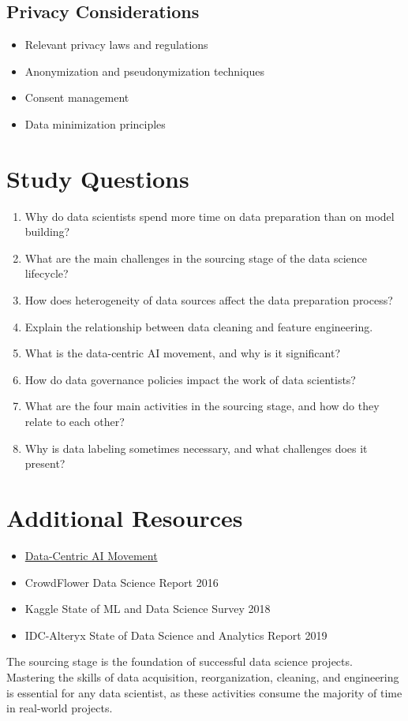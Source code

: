 \documentclass[12pt]{article}
\begin{document}
\subsection{Privacy Considerations}
\begin{itemize}
    \item Relevant privacy laws and regulations
    \item Anonymization and pseudonymization techniques
    \item Consent management
    \item Data minimization principles
\end{itemize}

\section{Study Questions}

\begin{enumerate}
    \item Why do data scientists spend more time on data preparation than on model building?
    \item What are the main challenges in the sourcing stage of the data science lifecycle?
    \item How does heterogeneity of data sources affect the data preparation process?
    \item Explain the relationship between data cleaning and feature engineering.
    \item What is the data-centric AI movement, and why is it significant?
    \item How do data governance policies impact the work of data scientists?
    \item What are the four main activities in the sourcing stage, and how do they relate to each other?
    \item Why is data labeling sometimes necessary, and what challenges does it present?
\end{enumerate}

\section{Additional Resources}

\begin{itemize}
    \item \href{https://datacentricai.org/}{Data-Centric AI Movement}
    \item CrowdFlower Data Science Report 2016
    \item Kaggle State of ML and Data Science Survey 2018
    \item IDC-Alteryx State of Data Science and Analytics Report 2019
\end{itemize}

\begin{tcolorbox}[colback=red!5!white,colframe=red!75!black,title=Key Takeaway]
The sourcing stage is the foundation of successful data science projects. Mastering the skills of data acquisition, reorganization, cleaning, and engineering is essential for any data scientist, as these activities consume the majority of time in real-world projects.
\end{tcolorbox}
\end{document}
